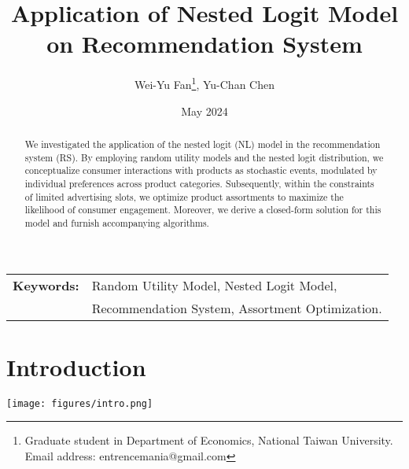 \documentclass[12pt]{article}
\title{Application of Nested Logit Model on Recommendation System}
\author{Wei-Yu Fan\thanks{
Graduate student in Department of Economics, National Taiwan University.\\ 
Email address: entrencemania@gmail.com
}, Yu-Chan Chen
}
\date{May 2024}
\theoremstyle{definition}
\begin{document}
\maketitle
\begin{sloppypar}
\begin{spacing}{0}
\begin{abstract}
\noindent 
We investigated the application of the nested logit (NL) model in the recommendation system (RS). By employing random utility models and the nested logit distribution, we conceptualize consumer interactions with products as stochastic events, modulated by individual preferences across product categories. Subsequently, within the constraints of limited advertising slots, we optimize product assortments to maximize the likelihood of consumer engagement. Moreover, we derive a closed-form solution for this model and furnish accompanying algorithms.
\end{abstract}
\end{spacing}
\begin{tabular}{rl}
\\
\textbf{Keywords:} &Random Utility Model, Nested Logit Model, \\
&Recommendation System, Assortment Optimization.\\
\end{tabular}

\newpage
\section{Introduction}

\texttt{[image: figures/intro.png]}

















\printbibliography


\end{sloppypar}
\end{document}
